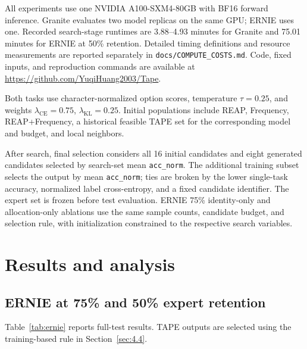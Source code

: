 \documentclass{article}
\begin{document}
All experiments use one NVIDIA A100-SXM4-80GB with BF16 forward inference. Granite evaluates two model replicas on the same GPU; ERNIE uses one. Recorded search-stage runtimes are 3.88--4.93 minutes for Granite and 75.01 minutes for ERNIE at 50\% retention. Detailed timing definitions and resource measurements are reported separately in \texttt{docs/COMPUTE\_COSTS.md}. Code, fixed inputs, and reproduction commands are available at \url{https://github.com/YuqiHuang2003/Tape}.

Both tasks use character-normalized option scores, temperature $\tau=0.25$, and weights $\lambda_{\mathrm{CE}}=0.75$, $\lambda_{\mathrm{KL}}=0.25$. Initial populations include REAP, Frequency, REAP+Frequency, a historical feasible TAPE set for the corresponding model and budget, and local neighbors.

After search, final selection considers all 16 initial candidates and eight generated candidates selected by search-set mean \texttt{acc\_norm}. The additional training subset selects the output by mean \texttt{acc\_norm}; ties are broken by the lower single-task accuracy, normalized label cross-entropy, and a fixed candidate identifier. The expert set is frozen before test evaluation. ERNIE 75\% identity-only and allocation-only ablations use the same sample counts, candidate budget, and selection rule, with initialization constrained to the respective search variables.

\section{Results and analysis}
\label{sec:5}
\subsection{ERNIE at 75\% and 50\% expert retention}
\label{sec:5.1}
Table~\ref{tab:ernie} reports full-test results. TAPE outputs are selected using the training-based rule in Section~\ref{sec:4.4}.
\end{document}

